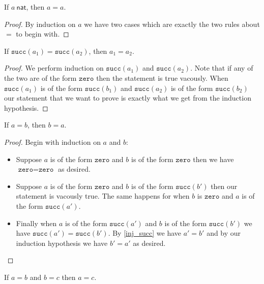 \begin{lemma}[Reflexivity of $=$]
    If $a\ \mathsf{nat}$, then $a = a$.
\end{lemma}

\begin{proof}
    By induction on $a$ we have two cases which are exactly the two rules about $=$ to begin with.
\end{proof}


\begin{lemma}\label{inj_succ}
    If $\texttt{succ}(a_1) = \texttt{succ}(a_2)$, then $a_1 = a_2$.
\end{lemma}

\begin{proof}
    We perform induction on $\texttt{succ}(a_1)$ and $\texttt{succ}(a_2)$. Note that if any of the two are of the form $\texttt{zero}$ then the statement is true vacously. When $\texttt{succ}(a_1)$ is of the form $\texttt{succ}(b_1)$ and $\texttt{succ}(a_2)$ is of the form $\texttt{succ}(b_2)$ our statement that we want to prove is exactly what we get from the induction hypothesis.
\end{proof}


\begin{lemma}[Symmetry of $=$]
    If $a = b$, then $b = a$.
\end{lemma}

\begin{proof}
    Begin with induction on $a$ and $b$:
    \begin{itemize}
        \item Suppose $a$ is of the form $\texttt{zero}$ and $b$ is of the form $\texttt{zero}$ then we have $\texttt{zero} = \texttt{zero}$ as desired.
        \item Suppose $a$ is of the form $\texttt{zero}$ and $b$ is of the form $\texttt{succ}(b')$ then our statement is vacously true. The same happens for when $b$ is $\texttt{zero}$ and $a$ is of the form $\texttt{succ}(a')$.
        \item Finally when $a$ is of the form $\texttt{succ}(a')$ and $b$ is of the form $\texttt{succ}(b')$ we have $\texttt{succ}(a')= \texttt{succ}(b')$. By \ref{inj_succ} we have $a'=b'$ and by our induction hypothesis we have $b' = a'$ as desired.
    \end{itemize}
\end{proof}


\begin{lemma}[Transitivity of $=$]
    If $a = b$ and $b = c$ then $a = c$.
\end{lemma}

